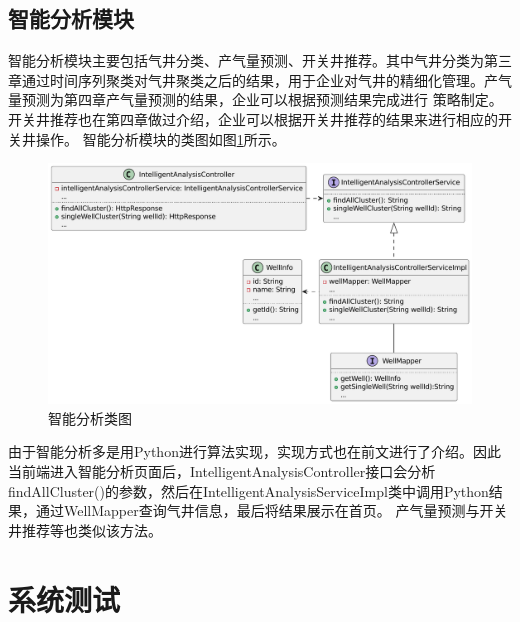 \subsection{智能分析模块}
智能分析模块主要包括气井分类、产气量预测、开关井推荐。其中气井分类为第三章通过时间序列聚类对气井聚类之后的结果，用于企业对气井的精细化管理。产气量预测为第四章产气量预测的结果，企业可以根据预测结果完成进行
策略制定。开关井推荐也在第四章做过介绍，企业可以根据开关井推荐的结果来进行相应的开关井操作。
智能分析模块的类图如图\ref{fig:analyclass}所示。
\begin{figure}[H]
    \centering
    \caption{智能分析类图}
    \label{fig:analyclass}
    \includegraphics[width=.9\linewidth]{figure/智能分析类图.pdf}
\end{figure}
由于智能分析多是用Python进行算法实现，实现方式也在前文进行了介绍。因此当前端进入智能分析页面后，IntelligentAnalysisController接口会分析findAllCluster()的参数，然后在IntelligentAnalysisServiceImpl类中调用Python结果，通过WellMapper查询气井信息，最后将结果展示在首页。
产气量预测与开关井推荐等也类似该方法。
\section{系统测试}
